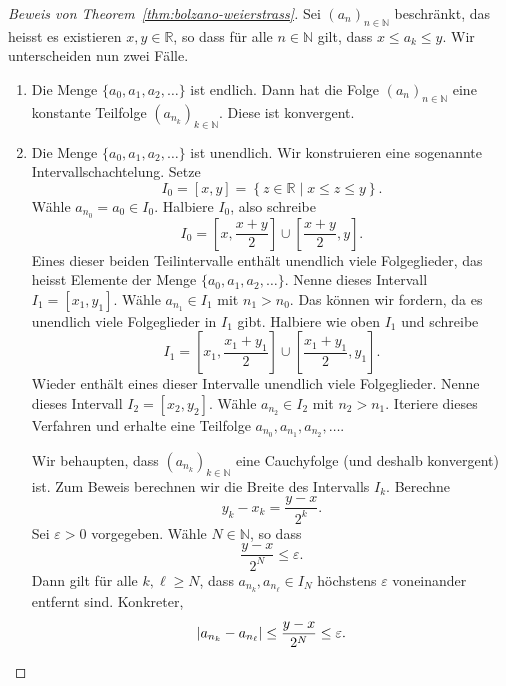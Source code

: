 \documentclass[../main.tex]{subfiles}
\begin{document}
\begin{proof}[Beweis von Theorem~\ref{thm:bolzano-weierstrass}]
  Sei ${(a_n)}_{n \in \mathbb{N}}$ beschränkt, das heisst
  es existieren $x, y \in \mathbb{R}$, so dass für
  alle $n \in \mathbb{N}$ gilt, dass $x \leq a_k \leq y$.
  Wir unterscheiden nun zwei Fälle.
  \begin{enumerate}[1.]
    \item Die Menge $\{a_0, a_1, a_2, \dots\}$ ist endlich.
      Dann hat die Folge ${(a_n)}_{n \in \mathbb{N}}$ 
      eine konstante Teilfolge
      ${(a_{n_k})}_{k \in \mathbb{N}}$.
      Diese ist konvergent.
    \item Die Menge $\{a_0, a_1, a_2, \dots\}$ ist unendlich.
      Wir konstruieren eine sogenannte Intervallschachtelung.
      Setze 
      \[
        I_0 = [x, y] = \left\{z \in \mathbb{R} 
        \mid x \leq z \leq y\right\}.
      \]
      Wähle $a_{n_0} = a_0 \in I_0$. Halbiere $I_0$, also
      schreibe
      \[
        I_0 = \left[ x, \frac{x+y}{2} \right] 
        \cup \left[ \frac{x+y}{2}, y \right].
      \]
      Eines dieser beiden Teilintervalle enthält
      unendlich viele Folgeglieder,
      das heisst Elemente der Menge
      $\{a_0, a_1, a_2, \dots\}$. Nenne dieses Intervall
      $I_1 = [x_1, y_1]$. Wähle $a_{n_1} \in I_1$
      mit $n_1 > n_0$. Das können wir fordern,
      da es unendlich viele Folgeglieder in 
      $I_1$ gibt.
      Halbiere wie oben $I_1$ und schreibe
      \[
        I_1 = \left[ x_1, \frac{x_1 + y_1}{2} \right] 
        \cup \left[ \frac{x_1 + y_1}{2}, y_1 \right].
      \]
      Wieder enthält eines dieser Intervalle
      unendlich viele Folgeglieder. Nenne dieses
      Intervall $I_2 = [x_2, y_2]$. Wähle
      $a_{n_2} \in I_2$ mit $n_{2} > n_1$.
      Iteriere dieses Verfahren und erhalte eine
      Teilfolge $a_{n_0}, a_{n_1}, a_{n_2}, \dots$.

      Wir behaupten, dass ${(a_{n_k})}_{k \in \mathbb{N}}$
      eine Cauchyfolge (und deshalb konvergent) ist.
      Zum Beweis berechnen wir die Breite des
      Intervalls $I_k$. Berechne
      \[
        y_k - x_k = \frac{y - x}{2^k}.
      \]
      Sei $\varepsilon > 0$ vorgegeben. Wähle
      $N \in \mathbb{N}$, so dass
      \[
        \frac{y-x}{2^N} \leq \varepsilon.
      \]
      Dann gilt für alle $k, \ell \geq N$, dass
      $a_{n_k}, a_{n_\ell} \in I_N$ höchstens
      $\varepsilon$ voneinander entfernt sind.
      Konkreter,
      \[
        |a_{n_k} - a_{n_\ell}| 
        \leq \frac{y-x}{2^N} \leq \varepsilon. \qedhere
      \]
  \end{enumerate}
\end{proof}
\end{document}

